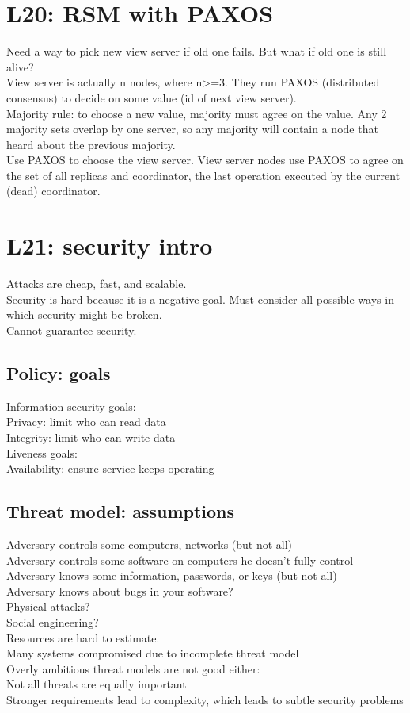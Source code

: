 \section{L20: RSM with PAXOS}
Need a way to pick new view server if old one fails. But what if old one is still alive?\\
View server is actually n nodes, where n>=3. They run PAXOS (distributed consensus) to decide on some value (id of next view server).\\
Majority rule: to choose a new value, majority must agree on the value. Any 2 majority sets overlap by one server, so any majority will contain a node that heard about the previous majority.\\
Use PAXOS to choose the view server. View server nodes use PAXOS to agree on the set of all replicas and coordinator, the last operation executed by the current (dead) coordinator.\\
\section{L21: security intro}
Attacks are cheap, fast, and scalable.\\
Security is hard because it is a negative goal. Must consider all possible ways in which security might be broken.\\
Cannot guarantee security.\\
\subsection{Policy: goals}
Information security goals: \\
Privacy: limit who can read data\\
Integrity: limit who can write data\\
Liveness goals:\\
Availability: ensure service keeps operating\\
\subsection{Threat model: assumptions}
Adversary controls some computers, networks (but not all) \\
Adversary controls some software on computers he doesn't fully control\\
Adversary knows some information, passwords, or keys (but not all)\\
Adversary knows about bugs in your software?\\
Physical attacks?\\
Social engineering?\\
Resources are hard to estimate.\\
Many systems compromised due to incomplete threat model\\
Overly ambitious threat models are not good either:\\
Not all threats are equally important\\
Stronger requirements lead to complexity, which leads to subtle security problems

